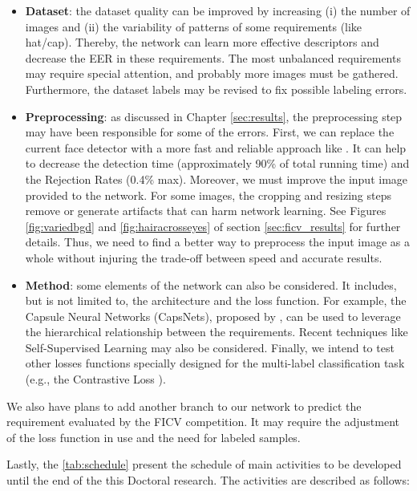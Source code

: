 \begin{itemize}
\item \textbf{Dataset}: the dataset quality can be improved by increasing (i) the number of images and (ii) the variability of patterns of some requirements (like hat/cap). Thereby, the network can learn more effective descriptors and decrease the EER in these requirements. The most unbalanced requirements may require special attention, and probably more images must be gathered. Furthermore, the dataset labels may be revised to fix possible labeling errors.

\item \textbf{Preprocessing}: as discussed in Chapter \ref{sec:results}, the preprocessing step may have been responsible for some of the errors. First, we can replace the current face detector with a more fast and reliable approach like \cite{faceboxes}. It can help to decrease the detection time (approximately 90\% of total running time) and the Rejection Rates (0.4\% max). Moreover, we must improve the input image provided to the network. For some images, the cropping and resizing steps remove or generate artifacts that can harm network learning. See Figures \ref{fig:variedbgd} and \ref{fig:hairacrosseyes} of section \ref{sec:ficv_results} for further details. Thus, we need to find a better way to preprocess the input image as a whole without injuring the trade-off between speed and accurate results.

\item \textbf{Method}: some elements of the network can also be considered. It includes, but is not limited to, the architecture and the loss function. For example, the Capsule Neural Networks (CapsNets), proposed by \cite{sabour2017dynamic}, can be used to leverage the hierarchical relationship between the requirements. Recent techniques like Self-Supervised Learning \citep{doersch2017multi} may also be considered. Finally, we intend to test other losses functions specially designed for the multi-label classification task (e.g., the Contrastive Loss \citep{khosla2020supervised}).
\end{itemize}

We also have plans to add another branch to our network to predict the \eyecenterlocation requirement evaluated by the FICV competition. It may require the adjustment of the loss function in use and the need for labeled samples.



Lastly, the \autoref{tab:schedule} present the schedule of main activities to be developed until the end of the this Doctoral research. The activities are described as follows:

